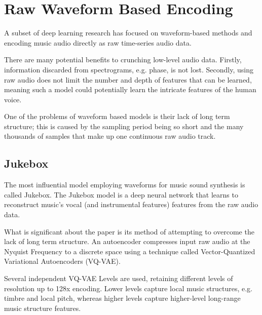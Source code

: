 \section{Raw Waveform Based Encoding}

A subset of deep learning research has focused on waveform-based methods and encoding music audio directly as raw time-series audio data.

There are many potential benefits to crunching low-level audio data. Firstly, information discarded from spectrograms, e.g. phase, is not lost. Secondly, using raw audio does not limit the number and depth of features that can be learned, meaning such a model could potentially learn the intricate features of the human voice.

One of the problems of waveform based models is their lack of long term structure; this is caused by the sampling period being so short and the many thousands of samples that make up one continuous raw audio track\cite{JukeboxWebsite}.

\subsection{Jukebox}

The most influential model employing waveforms for music sound synthesis is called Jukebox\cite{Jukebox}. The Jukebox model is a deep neural network that learns to reconstruct music's vocal (and instrumental features) features from the raw audio data.

What is significant about the paper is its method of attempting to overcome the lack of long term structure. An autoencoder compresses input raw audio at the Nyquist Frequency to a discrete space using a technique called Vector-Quantized Variational Autoencoders (VQ-VAE)\cite{Jukebox}.

\vspace{0.5cm}
\vspace{0.5cm}

Several independent VQ-VAE Levels are used, retaining different levels of resolution up to 128x encoding. Lower levels capture local music structures, e.g. timbre and local pitch, whereas higher levels capture higher-level long-range music structure features.

